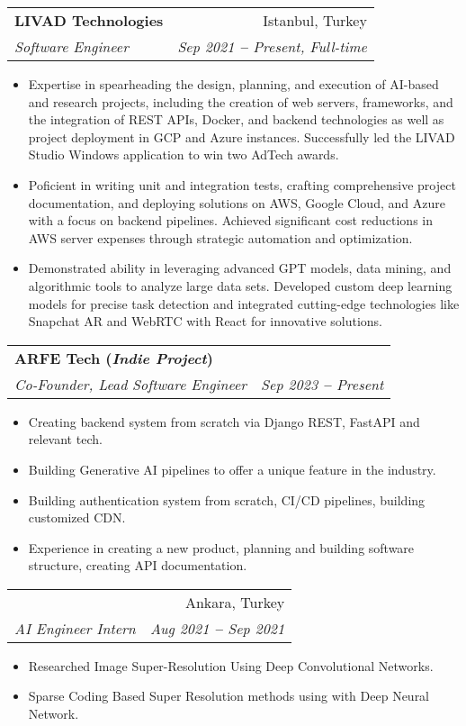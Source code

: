 \documentclass[letterpaper,11pt]{article}
\makeatletter
\newcommand{\resumeItem}[1]{
  \item\small{
    {#1 \vspace{-2pt}}
  }
}
\newcommand{\resumeSubheading}[4]{
  \vspace{-2pt}\item
    \begin{tabular*}{0.97\textwidth}[t]{l@{\extracolsep{\fill}}r}
      \textbf{#1} & #2 \\
      \textit{\small#3} & \textit{\small #4} \\
    \end{tabular*}\vspace{-7pt}
}
\newcommand{\resumeItemListStart}{\begin{itemize}}
\newcommand{\resumeItemListEnd}{\end{itemize}\vspace{-5pt}}
\makeatother
\begin{document}
{{    \resumeSubheading
      {LIVAD Technologies}{Istanbul, Turkey}
      {Software Engineer}{Sep 2021 \textbf{--} Present, Full-time}
        \resumeItemListStart
            \resumeItem{Expertise in spearheading the design, planning, and execution of AI-based and research projects, including the creation of web servers, frameworks, and the integration of REST APIs, Docker, and backend technologies as well as project deployment in GCP and Azure instances. Successfully led the LIVAD Studio Windows application to win two AdTech awards.}
            \resumeItem{Poficient in writing unit and integration tests, crafting comprehensive project documentation, and deploying solutions on AWS, Google Cloud, and Azure with a focus on backend pipelines. Achieved significant cost reductions in AWS server expenses through strategic automation and optimization.}
            \resumeItem{Demonstrated ability in leveraging advanced GPT models, data mining, and algorithmic tools to analyze large data sets. Developed custom deep learning models for precise task detection and integrated cutting-edge technologies like Snapchat AR and WebRTC with React for innovative solutions.}

        \resumeItemListEnd
\vspace{5pt}
  
    \resumeSubheading
      {ARFE Tech (\textit{Indie Project})}{}
      {Co-Founder, Lead Software Engineer}{Sep 2023 \textbf{--} Present}
        \resumeItemListStart
            \resumeItem{Creating backend system from scratch via Django REST, FastAPI and relevant tech.}
            \resumeItem{Building Generative AI pipelines to offer a unique feature in the industry.}
            \resumeItem{Building authentication system from scratch, CI/CD pipelines, building customized CDN.}
            \resumeItem{Experience in creating a new product, planning and building software structure, creating API documentation.}
        \resumeItemListEnd

  \vspace{5pt}
        \resumeSubheading
           {\parbox{0.7\linewidth}{The Scientific and Technological Research Council of Turkey (TUBITAK) Space Technologies}}{Ankara, Turkey}
      {AI Engineer Intern}{Aug 2021 \textbf{--} Sep 2021}
        \resumeItemListStart
            \resumeItem{Researched Image Super-Resolution Using Deep Convolutional Networks.}
            \resumeItem{Sparse Coding Based Super Resolution methods using with Deep Neural Network.}
        \resumeItemListEnd

}}
\end{document}
